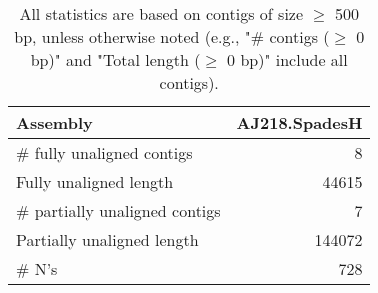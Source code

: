 \documentclass[12pt,a4paper]{article}
\begin{document}
\begin{table}[ht]
\begin{center}
\caption{All statistics are based on contigs of size $\geq$ 500 bp, unless otherwise noted (e.g., "\# contigs ($\geq$ 0 bp)" and "Total length ($\geq$ 0 bp)" include all contigs).}
\begin{tabular}{|l*{1}{|r}|}
\hline
Assembly & AJ218.SpadesH \\ \hline
\# fully unaligned contigs & 8 \\ \hline
Fully unaligned length & 44615 \\ \hline
\# partially unaligned contigs & 7 \\ \hline
Partially unaligned length & 144072 \\ \hline
\# N's & 728 \\ \hline
\end{tabular}
\end{center}
\end{table}
\end{document}

